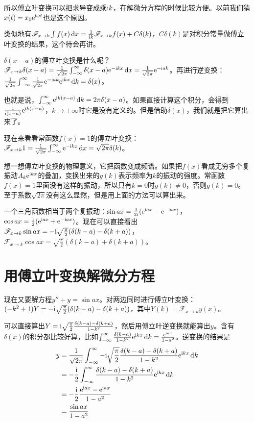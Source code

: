 所以傅立叶变换可以把求导变成乘$\mathrm{i} k$，在解微分方程的时候比较方便。以前我们猜$x(t)=x_0 \mathrm{e}^{\mathrm{i} \omega t}$也是这个原因。

类似地有$\mathscr{F}_{x \rightarrow k} \int f(x) \mathop{}\!\mathrm{d} x=\frac{1}{\mathrm{i} k} \mathscr{F}_{x \rightarrow k} f(x)+C \delta(k)$，$C \delta(k)$是对积分常量做傅立叶变换的结果，这个待会再讲。

$\delta(x-a)$的傅立叶变换是什么呢？$\mathscr{F}_{x \rightarrow k} \delta(x-a)=\frac{1}{\sqrt{2 \pi}} \int_{-\infty}^{\infty} \delta(x-a) \mathrm{e}^{-\mathrm{i} k x} \mathop{}\!\mathrm{d} x=\frac{1}{\sqrt{2 \pi}} \mathrm{e}^{-\mathrm{i} a k}$。再进行逆变换：$\frac{1}{\sqrt{2 \pi}} \int_{-\infty}^{\infty} \frac{1}{\sqrt{2 \pi}} \mathrm{e}^{-\mathrm{i} a k} \mathrm{e}^{\mathrm{i} k x} \mathop{}\!\mathrm{d} k=\delta(x)$。

也就是说，$\int_{-\infty}^{\infty} \mathrm{e}^{\mathrm{i} k (x-a)} \mathop{}\!\mathrm{d} k=2 \pi \delta(x-a)$。如果直接计算这个积分，会得到$\frac{1}{\mathrm{i} (x-a)} \mathrm{e}^{\mathrm{i} k (x-a)}$，$k \rightarrow \pm \infty$时它是没有定义的。但是借助$\delta(x)$，我们就是把它算出来了。

现在来看看常函数$f(x)=1$的傅立叶变换：$\mathscr{F}_{x \rightarrow k} 1=\frac{1}{\sqrt{2 \pi}} \int_{-\infty}^{\infty} \mathrm{e}^{-\mathrm{i} k x} \mathop{}\!\mathrm{d} x=\sqrt{2 \pi} \delta(k)$。

想一想傅立叶变换的物理意义，它把函数变成频谱。如果把$f(x)$看成无穷多个复振动$A_k \mathrm{e}^{\mathrm{i} k x}$的叠加，变换出来的$g(k)$表示频率为$k$的振动的强度。常函数$f(x)=1$里面没有这样的振动，所以只有$k=0$时$g(k) \neq 0$，否则$g(k)=0$。至于系数$\sqrt{2 \pi}$没有这么显然，但是用上面的方法可以算出来。

一个三角函数相当于两个复振动：$\sin a x=\frac{1}{2 \mathrm{i}}(\mathrm{e}^{\mathrm{i} a x}-\mathrm{e}^{-\mathrm{i} a x})$，$\cos a x=\frac{1}{2}(\mathrm{e}^{\mathrm{i} a x}+\mathrm{e}^{-\mathrm{i} a x})$。现在可以直接看出$\mathscr{F}_{x \rightarrow k} \sin a x=-\mathrm{i} \sqrt{\frac{\pi}{2}} (\delta(k-a)-\delta(k+a))$，$\mathscr{F}_{x \rightarrow k} \cos a x=\sqrt{\frac{\pi}{2}} (\delta(k-a)+\delta(k+a))$。
\section{用傅立叶变换解微分方程}
现在又要解方程$y''+y=\sin a x$。对两边同时进行傅立叶变换：$(-k^2+1) Y=-\mathrm{i} \sqrt{\frac{\pi}{2}} (\delta(k-a)-\delta(k+a))$，其中$Y(k)=\mathscr{F}_{x \rightarrow k} y(x)$。

可以直接算出$Y=\mathrm{i} \sqrt{\frac{\pi}{2}} \frac{\delta(k-a)-\delta(k+a)}{1-k^2}$，然后用傅立叶逆变换就能算出$y$。含有$\delta(x)$的积分都比较好算，比如$\int_{-\infty}^{\infty} \frac{\delta(k-a)}{1-k^2} \mathrm{e}^{\mathrm{i} k x} \mathop{}\!\mathrm{d} k=\frac{\mathrm{e}^{\mathrm{i} a x}}{1-a^2}$。逆变换的结果是
\begin{align*}
y&=\frac{1}{\sqrt{2 \pi}} \int_{-\infty}^{\infty} -\mathrm{i} \sqrt{\frac{\pi}{2}} \frac{\delta(k-a)-\delta(k+a)}{1-k^2} \mathrm{e}^{\mathrm{i} k x} \mathop{}\!\mathrm{d} k \\
&=-\frac{\mathrm{i}}{2} \int_{-\infty}^{\infty} \frac{\delta(k-a)-\delta(k+a)}{1-k^2} \mathrm{e}^{\mathrm{i} k x} \mathop{}\!\mathrm{d} k \\
&=-\frac{\mathrm{i}}{2} \frac{\mathrm{e}^{\mathrm{i} a x}-\mathrm{e}^{\mathrm{i} a x}}{1-a^2} \\
&=\frac{\sin a x}{1-a^2}
\end{align*}

